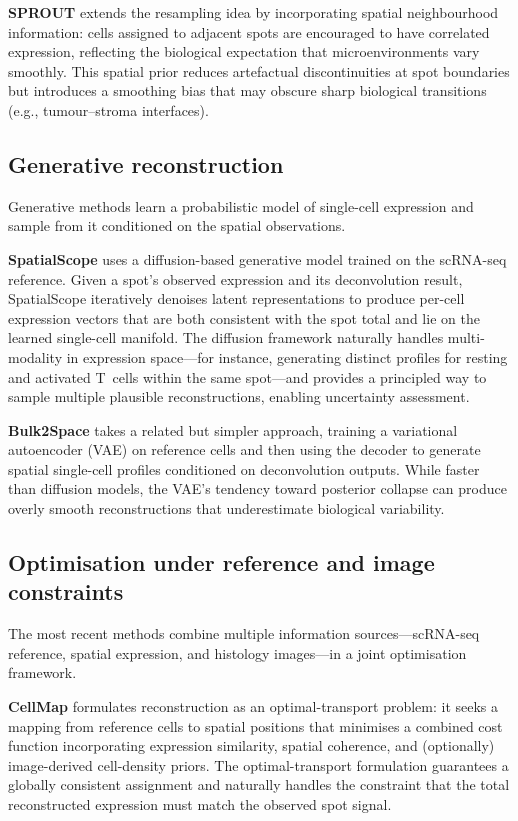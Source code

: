 \textbf{SPROUT} extends the resampling idea by incorporating spatial neighbourhood information: cells assigned to adjacent spots are encouraged to have correlated expression, reflecting the biological expectation that microenvironments vary smoothly. This spatial prior reduces artefactual discontinuities at spot boundaries but introduces a smoothing bias that may obscure sharp biological transitions (e.g., tumour--stroma interfaces).

\subsection{Generative reconstruction}

Generative methods learn a probabilistic model of single-cell expression and sample from it conditioned on the spatial observations.

\textbf{SpatialScope} \citep{shengquan2023spatialscope} uses a diffusion-based generative model trained on the scRNA-seq reference. Given a spot's observed expression and its deconvolution result, SpatialScope iteratively denoises latent representations to produce per-cell expression vectors that are both consistent with the spot total and lie on the learned single-cell manifold. The diffusion framework naturally handles multi-modality in expression space---for instance, generating distinct profiles for resting and activated T~cells within the same spot---and provides a principled way to sample multiple plausible reconstructions, enabling uncertainty assessment.

\textbf{Bulk2Space} takes a related but simpler approach, training a variational autoencoder (VAE) on reference cells and then using the decoder to generate spatial single-cell profiles conditioned on deconvolution outputs. While faster than diffusion models, the VAE's tendency toward posterior collapse can produce overly smooth reconstructions that underestimate biological variability.

\subsection{Optimisation under reference and image constraints}

The most recent methods combine multiple information sources---scRNA-seq reference, spatial expression, and histology images---in a joint optimisation framework.

\textbf{CellMap} \citep{cellmap2026} formulates reconstruction as an optimal-transport problem: it seeks a mapping from reference cells to spatial positions that minimises a combined cost function incorporating expression similarity, spatial coherence, and (optionally) image-derived cell-density priors. The optimal-transport formulation guarantees a globally consistent assignment and naturally handles the constraint that the total reconstructed expression must match the observed spot signal.


